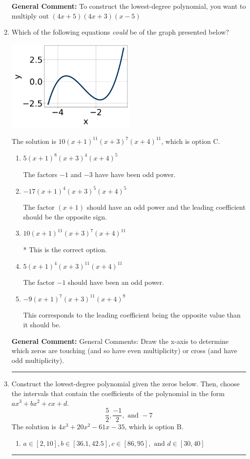 \documentclass{extbook}[14pt]
\newcommand{\litem}[1]{\item #1

\rule{\textwidth}{0.4pt}}
\begin{document}
\begin{enumerate}
{\textbf{General Comment:} To construct the lowest-degree polynomial, you want to multiply out $(4x + 5)(4x + 3)(x -5)$
}
\litem{
Which of the following equations \textit{could} be of the graph presented below?

\begin{center}
    \includegraphics[width=0.5\textwidth]{../Figures/polyGraphToFunctionA.png}
\end{center}


The solution is \( 10(x + 1)^{11} (x + 3)^{7} (x + 4)^{11} \), which is option C.\begin{enumerate}[label=\Alph*.]
\item \( 5(x + 1)^{8} (x + 3)^{4} (x + 4)^{5} \)

The factors $-1$ and $-3$ have have been odd power.
\item \( -17(x + 1)^{4} (x + 3)^{5} (x + 4)^{5} \)

The factor $(x + 1)$ should have an odd power and the leading coefficient should be the opposite sign.
\item \( 10(x + 1)^{11} (x + 3)^{7} (x + 4)^{11} \)

* This is the correct option.
\item \( 5(x + 1)^{4} (x + 3)^{11} (x + 4)^{11} \)

The factor $-1$ should have been an odd power.
\item \( -9(x + 1)^{7} (x + 3)^{11} (x + 4)^{9} \)

This corresponds to the leading coefficient being the opposite value than it should be.
\end{enumerate}

\textbf{General Comment:} General Comments: Draw the x-axis to determine which zeros are touching (and so have even multiplicity) or cross (and have odd multiplicity).
}
\litem{
Construct the lowest-degree polynomial given the zeros below. Then, choose the intervals that contain the coefficients of the polynomial in the form $ax^3+bx^2+cx+d$.
\[ \frac{5}{2}, \frac{-1}{2}, \text{ and } -7 \]The solution is \( 4x^{3} +20 x^{2} -61 x -35 \), which is option B.\begin{enumerate}[label=\Alph*.]
\item \( a \in [2, 10], b \in [36.1, 42.5], c \in [86, 95], \text{ and } d \in [30, 40] \)


\end{enumerate}}
\end{enumerate}
\end{document}
